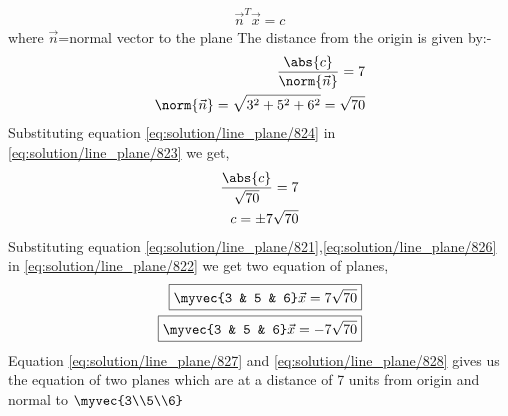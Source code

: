 \begin{align}\label{eq:solution/line_plane/822}
   \vec{n}^T\vec{x} = c
\end{align}
where $\vec{n}$=normal vector to the plane
The distance from the origin is given by:-
\begin{align}
    \frac{\abs{c}}{\norm{\vec{n}}} = 7\label{eq:solution/line_plane/823}\\
    \norm{\vec{n}}=\sqrt{3^2+5^2+6^2}=\sqrt{70}\label{eq:solution/line_plane/824}
\end{align}
Substituting equation \eqref{eq:solution/line_plane/824} in \eqref{eq:solution/line_plane/823} we get,
\begin{align}
    \frac{\abs{c}}{\sqrt{70}}=7\label{eq:solution/line_plane/825}\\
    c=\pm{7\sqrt{70}}\label{eq:solution/line_plane/826}
\end{align}
Substituting equation \eqref{eq:solution/line_plane/821},\eqref{eq:solution/line_plane/826} in \eqref{eq:solution/line_plane/822} we get two equation of planes,
\begin{align}
    \boxed{\myvec{3 & 5 & 6}\vec{x}=7\sqrt{70}}\label{eq:solution/line_plane/827}\\
     \boxed{\myvec{3 & 5 & 6}\vec{x}=-7\sqrt{70}}\label{eq:solution/line_plane/828}
\end{align}
Equation \eqref{eq:solution/line_plane/827} and \eqref{eq:solution/line_plane/828} gives us the equation of two planes which are at a distance of 7 units from origin and normal to $\myvec{3\\5\\6}$
%
